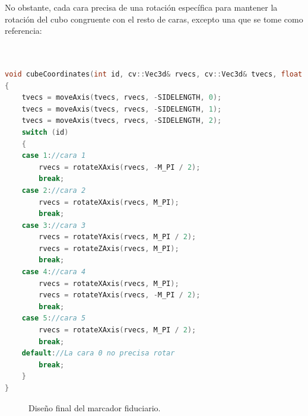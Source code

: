 No obstante, cada cara precisa de una rotación específica para mantener la rotación del cubo congruente con el resto de caras, excepto una que se tome como referencia:
\begin{lstlisting}[language=C++]


void cubeCoordinates(int id, cv::Vec3d& rvecs, cv::Vec3d& tvecs, float sideLength)
{
    tvecs = moveAxis(tvecs, rvecs, -SIDELENGTH, 0);
    tvecs = moveAxis(tvecs, rvecs, -SIDELENGTH, 1);
    tvecs = moveAxis(tvecs, rvecs, -SIDELENGTH, 2);
    switch (id)
    {
    case 1://cara 1
        rvecs = rotateXAxis(rvecs, -M_PI / 2);
        break;
    case 2://cara 2
        rvecs = rotateXAxis(rvecs, M_PI);
        break;
    case 3://cara 3
        rvecs = rotateYAxis(rvecs, M_PI / 2);
        rvecs = rotateZAxis(rvecs, M_PI);
        break;
    case 4://cara 4
        rvecs = rotateXAxis(rvecs, M_PI);
        rvecs = rotateYAxis(rvecs, -M_PI / 2);
        break;
    case 5://cara 5
        rvecs = rotateXAxis(rvecs, M_PI / 2);
        break;
    default://La cara 0 no precisa rotar
        break;
    }
}
\end{lstlisting}


\begin{figure}%
    \centering
    \qquad
    \caption{Diseño final del marcador fiduciario.}%
    \label{fig:cubo_marker}%
\end{figure}

